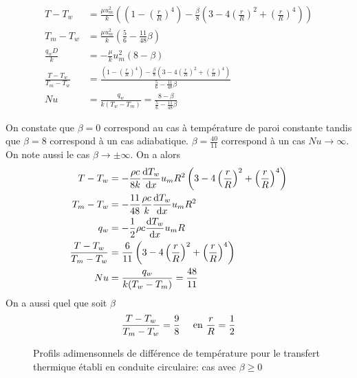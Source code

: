       \begin{equation}
        \begin{aligned}
          T-T_w &= \frac{\mu u_m^2}{k} \left( \left(1-\left(\frac{r}{R}\right)^4\right) - \frac{\beta}{8} \left(3-4\left(\frac{r}{R}\right)^2 + \left(\frac{r}{R}\right)^4\right)\right)\\
          T_m -T_w &= \frac{\mu u_m^2}{k} \left(\frac{5}{6} - \frac{11}{48}\beta\right)\\
          \frac{q_w D}{k} &= - \frac{\mu}{k} u_m^2 (8-\beta)\\
          \frac{T-T_w}{T_m - T_w} &= \frac{\left(1-\left(\frac{r}{R}\right)^4\right) - \frac{\beta}{8} \left(3-4\left(\frac{r}{R}\right)^2 + \left(\frac{r}{R}\right)^4\right)}{\frac{5}{6} - \frac{11}{48}\beta}\\
          Nu &= \frac{q_w}{k(T_w - T_m)} = \frac{8-\beta}{\frac{5}{6} - \frac{11}{48}\beta}
        \end{aligned}
      \end{equation}

      On constate que $\beta=0$ correspond au cas à température de paroi constante tandis que $\beta=8$ correspond à un cas adiabatique. $\beta=\frac{40}{11}$ correspond à un cas $Nu \rightarrow \infty$. On note aussi le cas $\beta \rightarrow \pm \infty$. On a alors
      \begin{equation}
        \begin{aligned}
          T-T_w &= -\frac{\rho c}{8k} \dv{T_w}{x} u_m R^2 \left(3-4\left(\frac{r}{R}\right)^2 + \left(\frac{r}{R}\right)^4\right)\\
          T_m -T_w &= - \frac{11}{48} \frac{\rho c}{k} \dv{T_w}{x} u_m R^2 \\
          q_w &= -\frac{1}{2} \rho c \dv{T_w}{x} u_m R\\
          \frac{T-T_w}{T_m - T_w} &= \frac{6}{11}\left(3-4\left(\frac{r}{R}\right)^2 + \left(\frac{r}{R}\right)^4\right)\\
          Nu &= \frac{q_w}{k(T_w - T_m)} = \frac{48}{11}
        \end{aligned}
      \end{equation}
      On a aussi quel que soit $\beta$
      \begin{equation}
        \frac{T-T_w}{T_m-T_w} = \frac{9}{8} \quad \textrm{ en } \frac{r}{R} = \frac{1}{2}
      \end{equation}

      \begin{figure}[!h]
        \centering
        
        \caption{Profils adimensonnels de différence de température pour le transfert thermique établi en conduite circulaire: cas avec $\beta \geq 0$}
        \label{fig:profilDiffTempNeg}
      \end{figure}

